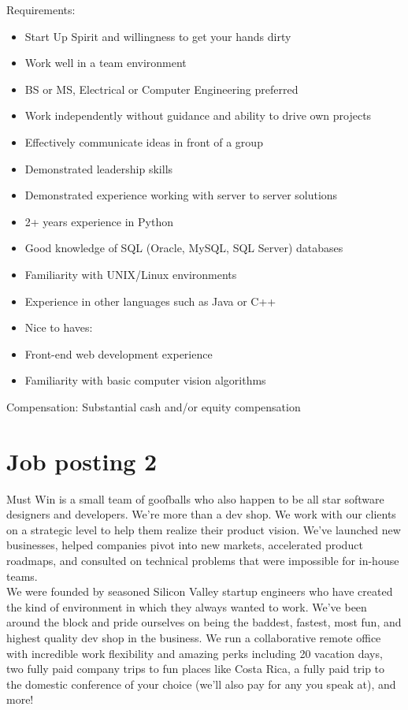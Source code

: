 Requirements:
\begin{itemize}
\item Start Up Spirit and willingness to get your hands dirty
\item Work well in a team environment
\item BS or MS, Electrical or Computer Engineering preferred
\item Work independently without guidance and ability to drive own projects
\item Effectively communicate ideas in front of a group
\item Demonstrated leadership skills
\item Demonstrated experience working with server to server solutions
\item 2+ years experience in Python
\item Good knowledge of SQL (Oracle, MySQL, SQL Server) databases
\item Familiarity with UNIX/Linux environments
\item Experience in other languages such as Java or C++
\item Nice to haves:
\item Front-end web development experience
\item Familiarity with basic computer vision algorithms
\end{itemize}

Compensation: Substantial cash and/or equity compensation

\section{Job posting 2}\label{sec:job-posting-two}
Must Win is a small team of goofballs who also happen to be all star software designers and developers. We're more than a dev shop. We work with our clients on a strategic level to help them realize their product vision. We've launched new businesses, helped companies pivot into new markets, accelerated product roadmaps, and consulted on technical problems that were impossible for in-house teams.\\

We were founded by seasoned Silicon Valley startup engineers who have created the kind of environment in which they always wanted to work. We've been around the block and pride ourselves on being the baddest, fastest, most fun, and highest quality dev shop in the business. We run a collaborative remote office with incredible work flexibility and amazing perks including 20 vacation days, two fully paid company trips to fun places like Costa Rica, a fully paid trip to the domestic conference of your choice (we'll also pay for any you speak at), and more!\\

